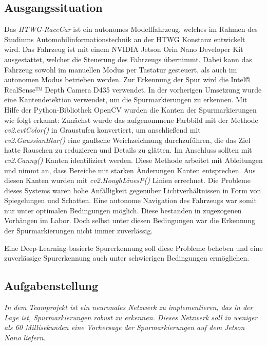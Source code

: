 \documentclass{article}
\begin{document}
        \subsection{Ausgangssituation}
            Das \textit{HTWG-RaceCar} ist ein autonomes Modellfahrzeug, welches im Rahmen des Studiums Automobilinformationstechnik an der HTWG Konstanz entwickelt wird.
            Das Fahrzeug ist mit einem NVIDIA Jetson Orin Nano Developer Kit
            ausgestattet, welcher die Steuerung des Fahrzeugs übernimmt.
            Dabei kann das Fahrzeug sowohl im manuellen Modus per Tastatur gesteuert, als auch im autonomen Modus betrieben werden.
            Zur Erkennung der Spur wird die Intel® RealSense™ Depth Camera D435 verwendet.
            In der vorherigen Umsetzung wurde eine Kantendetektion verwendet, um die Spurmarkierungen zu erkennen.
            Mit Hilfe der Python-Bibliothek OpenCV wurden die Kanten der Spurmarkierungen wie folgt erkannt:
            Zunächst wurde das aufgenommene Farbbild mit der Methode \textit{cv2.cvtColor()} in Graustufen konvertiert, um anschließend mit \textit{cv2.GaussianBlur()} eine gaußsche Weichzeichnung durchzuführen, die das Ziel hatte Rauschen zu reduzieren und Details zu glätten. Im Anschluss sollten mit \textit{cv2.Canny()} Kanten identifiziert werden. Diese Methode arbeitet mit Ableitungen und nimmt an, dass Bereiche mit starken Änderungen Kanten entsprechen.
            Aus diesen Kanten wurden mit \textit{cv2.HoughLinesP()} Linien errechnet. 
            Die Probleme dieses Systems waren hohe Anfälligkeit gegenüber Lichtverhältnissen in Form von Spiegelungen und Schatten.
            Eine autonome Navigation des Fahrzeugs war somit nur unter optimalen Bedingungen möglich. Diese bestanden in zugezogenen Vorhängen im Labor.
            Doch selbst unter diesen Bedingungen war die Erkennung der Spurmarkierungen nicht immer zuverlässig.

            Eine Deep-Learning-basierte Spurerkennung soll diese Probleme beheben und eine zuverlässige Spurerkennung auch unter schwierigen Bedingungen ermöglichen.

 

        \subsection{Aufgabenstellung}
            \textit{In dem Teamprojekt ist ein neuronales Netzwerk zu implementieren, das in der Lage ist, Spurmarkierungen robust zu erkennen. Dieses Netzwerk soll in weniger als 60 Millisekunden eine Vorhersage der Spurmarkierungen auf dem Jetson Nano liefern.}
\end{document}
